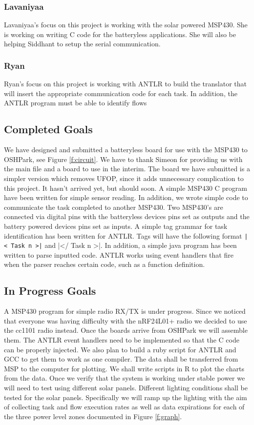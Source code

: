 \subsubsection{Lavaniyaa}
Lavaniyaa's focus on this project is working with the solar powered MSP430.
She is working on writing C code for the batteryless applications.
She will also be helping Siddhant to setup the serial communication.

\subsubsection{Ryan}
Ryan's focus on this project is working with ANTLR to build the translator that will insert the appropriate communication code for each task.
In addition, the ANTLR program must be able to identify flows

\subsection{Completed Goals}

We have designed and submitted a batteryless board for use with the MSP430 to OSHPark, see Figure \ref{f:circuit}.
We have to thank Simeon for providing us with the main file and a board to use in the interim.
The board we have submitted is a simpler version which removes UFOP, since it adds unnecessary complication to this project.
It hasn't arrived yet, but should soon.
A simple MSP430 C program have been written for simple sensor reading.
In addition, we wrote simple code to communicate the task completed to another MSP430.
Two MSP430's are connected via digital pins with the batteryless devices pins set as outputs and the battery powered devices pins set as inputs.
A simple tag grammar for task identification has been written for ANTLR.
Tags will have the following format {\tt |< Task n >|} and |</ Task n >|.
In addition, a simple java program has been written to parse inputted code.
ANTLR works using event handlers that fire when the parser reaches certain code, such as a function definition.

\subsection{In Progress Goals}

A MSP430 program for simple radio RX/TX is under progress.
Since we noticed that everyone was having difficulty with the nRF24L01+ radio we decided to use the cc1101 radio instead.
Once the boards arrive from OSHPark we will assemble them.
The ANTLR event handlers need to be implemented so that the C code can be properly injected.
We also plan to build a ruby script for ANTLR and GCC to get them to work as one compiler.
The data shall be transferred from MSP to the computer for plotting.
We shall write scripts in R to plot the charts from the data.
Once we verify that the system is working under stable power we will need to test using different solar panels.
Different lighting conditions shall be tested for the solar panels.
Specifically we will ramp up the lighting with the aim of collecting task and flow execution rates as well as data expirations for each of the three power level zones documented in Figure \ref{f:graph}.


